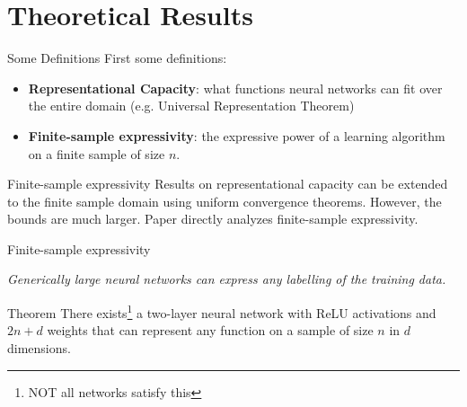 \documentclass[10pt]{beamer}
\begin{document}
\section{Theoretical Results}

\begin{frame}{Some Definitions}
	First some definitions:
	\begin{itemize}
		\item \textbf{Representational Capacity}: what functions neural networks can fit over the entire domain (e.g. Universal Representation Theorem)
		\item \textbf{Finite-sample expressivity}: the expressive power of a learning algorithm on a finite sample of size $n$.
	\end{itemize}
\end{frame}	

\begin{frame}{Finite-sample expressivity}
Results on representational capacity can be extended to the finite sample domain using uniform convergence theorems. However, the bounds are much larger. Paper directly analyzes finite-sample expressivity.
\end{frame}	

\begin{frame}{Finite-sample expressivity}
\begin{center}
	\emph{Generically large neural networks can express any labelling of the training data.}
\end{center}
\begin{block}{Theorem}
	There exists\footnote{NOT all networks satisfy this} a two-layer neural network with ReLU activations and $2n+d$
	weights that can represent any function on a sample of size $n$ in $d$ dimensions.
\end{block}
\end{frame}	
\end{document}
